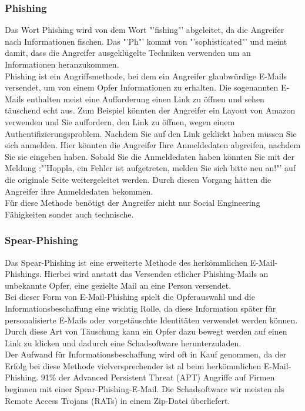 		\subsubsection{Phishing}
		Das Wort Phishing wird von dem Wort "'fishing"' abgeleitet, da die Angreifer nach Informationen fischen. Das "'Ph"' kommt von "'sophisticated"' und meint damit, dass die Angreifer ausgeklügelte Techniken verwenden um an Informationen heranzukommen.\cite{PhishingExposed}\\
		Phishing ist ein Angriffsmethode, bei dem ein Angreifer glaubwürdige E-Mails versendet, um von einem Opfer Informationen zu erhalten. Die sogenannten E-Mails enthalten meist eine Aufforderung einen Link zu öffnen und sehen täuschend echt aus. Zum Beispiel könnten der Angreifer ein Layout von Amazon verwenden und Sie auffordern, den Link zu öffnen, wegen einem Authentifizierungsproblem. Nachdem Sie auf den Link geklickt haben müssen Sie sich anmelden. Hier könnten die Angreifer Ihre Anmeldedaten abgreifen, nachdem Sie sie eingeben haben. Sobald Sie die Anmeldedaten haben könnten Sie mit der Meldung :"'Hoppla, ein Fehler ist aufgetreten, melden Sie sich bitte neu an!"' auf die originale Seite weitergeleitet werden. Durch diesen Vorgang hätten die Angreifer ihre Anmeldedaten bekommen.\\
		Für diese Methode benötigt der Angreifer nicht nur Social Engineering Fähigkeiten sonder auch technische.\cite{PhishingDarkWaters}
		
		\subsubsection{Spear-Phishing}
		Das Spear-Phishing ist eine erweiterte Methode des herkömmlichen E-Mail-Phishings. Hierbei wird anstatt das Versenden etlicher Phishing-Mails an unbekannte Opfer, eine gezielte Mail an eine Person versendet.\cite{SpearPhishingPaper}\\
		Bei dieser Form von E-Mail-Phishing spielt die Opferauswahl und die Informationsbeschaffung eine wichtig Rolle, da diese Information später für personalisierte E-Mails oder vorgetäuschte Identitäten verwendet werden können. Durch diese Art von Täuschung kann ein Opfer dazu bewegt werden auf einen Link zu klicken und dadurch eine Schadsoftware herunterzuladen.\cite{SpearPhishingPaper} \\
		Der Aufwand für Informationsbeschaffung wird oft in Kauf genommen, da der Erfolg bei diese Methode vielversprechender ist al beim herkömmlichen E-Mail-Phishing.
		91\% der Advanced Persistent Threat (APT) Angriffe auf Firmen beginnen mit einer Spear-Phishing-E-Mail. Die Schadsoftware wir meisten als Remote Access Trojans (RATs) in einem Zip-Datei überliefert.\cite{SpearPhishing}


